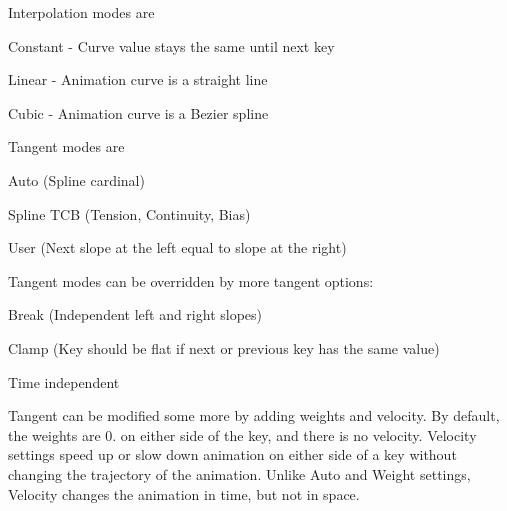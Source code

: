 Interpolation modes are \begin{DoxyItemize}
\item Constant -\/ Curve value stays the same until next key \item Linear -\/ Animation curve is a straight line \item Cubic -\/ Animation curve is a Bezier spline\end{DoxyItemize}
Tangent modes are \begin{DoxyItemize}
\item Auto (Spline cardinal) \item Spline T\+CB (Tension, Continuity, Bias) \item User (Next slope at the left equal to slope at the right)\end{DoxyItemize}
Tangent modes can be overridden by more tangent options\+: \begin{DoxyItemize}
\item Break (Independent left and right slopes) \item Clamp (Key should be flat if next or previous key has the same value) \item Time independent\end{DoxyItemize}
Tangent can be modified some more by adding weights and velocity. By default, the weights are 0. on either side of the key, and there is no velocity. Velocity settings speed up or slow down animation on either side of a key without changing the trajectory of the animation. Unlike Auto and Weight settings, Velocity changes the animation in time, but not in space.

